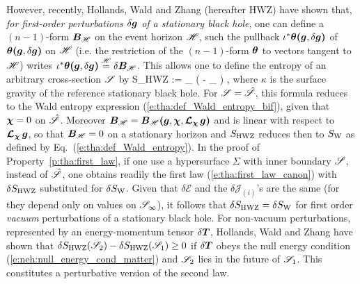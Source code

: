 However, recently, Hollands, Wald and Zhang \cite{HollaWZ24} (hereafter HWZ)
have shown that, \emph{for first-order perturbations $\delta\bm{g}$ of a stationary
black hole}, one can define a $(n-1)$-form $\bm{B}_{\mathscr{H}}$ on the event horizon
$\mathscr{H}$, such the pullback $\iota^*\bm{\theta}\textbf{(}\bm{g},\delta\bm{g}\textbf{)}$
of $\bm{\theta}\textbf{(}\bm{g},\delta\bm{g}\textbf{)}$
on $\mathscr{H}$ (i.e. the restriction of the $(n-1)$-form $\bm{\theta}$ to vectors
tangent to $\mathscr{H}$) writes
$\iota^*\bm{\theta}\textbf{(}\bm{g},\delta\bm{g}\textbf{)} \stackrel{\mathscr{H}}{=} \delta \bm{B}_{\mathscr{H}}$.
This allows one to define the entropy of an arbitrary cross-section $\mathscr{S}$ by
\be
    S_{\rm HWZ} :=
    \int_{\Sp}  \left(  \lld\w{\chi}\rld - \w{\chi}\cdot{}_{\Hor} \right) ,
\ee
where $\kappa$ is the surface gravity of the reference stationary black hole.
For $\mathscr{S} = \hat{\mathscr{S}}$, this formula reduces to the Wald entropy expression (\ref{e:tha:def_Wald_entropy_bif}), given that $\bm{\chi} = 0$ on $\hat{\mathscr{S}}$.
Moreover $\bm{B}_{\mathscr{H}} =  \bm{B}_{\mathscr{H}}\textbf{(}\bm{g},\bm{\chi},\bm{\mathcal{L}}_{\bm{\chi}}\,\bm{g}\textbf{)}$
and is linear with respect to $\bm{\mathcal{L}}_{\bm{\chi}}\,\bm{g}$, so that $\bm{B}_{\mathscr{H}} = 0$
on a stationary horizon and $S_{\rm HWZ}$ reduces then to $S_{\rm W}$ as defined by
Eq.~(\ref{e:tha:def_Wald_entropy}).
In the proof of Property~\ref{p:tha:first_law},
if one use a hypersurface $\Sigma$ with inner boundary $\mathscr{S}$, instead
of $\hat{\mathscr{S}}$, one obtains readily
the first law (\ref{e:tha:first_law_canon}) with $\delta S_{\rm HWZ}$ substituted
for $\delta S_{\rm W}$.
Given that $\delta\mathcal{E}$ and the $\delta\mathcal{J}_{(i)}$'s are the same
(for they depend only on values on $\mathscr{S}_\infty$),
it follows that  $\delta S_{\rm HWZ} = \delta S_{\rm W}$ for
first order \emph{vacuum} perturbations of a stationary black hole. For non-vacuum perturbations, represented by an energy-momentum tensor $\delta\bm{T}$,
Hollands, Wald and Zhang \cite{HollaWZ24} have shown that $\delta S_{\rm HWZ}(\mathscr{S}_2)
- \delta S_{\rm HWZ}(\mathscr{S}_1) \geq 0$
if $\delta\bm{T}$ obeys the null energy condition (\ref{e:neh:null_energy_cond_matter})
and $\mathscr{S}_2$ lies in the future of $\mathscr{S}_1$. This constitutes a perturbative
version of the second law.

